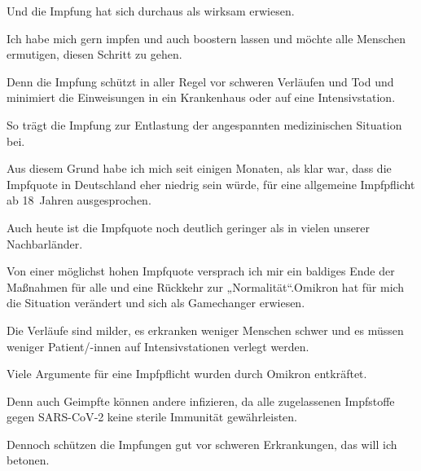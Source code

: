 \documentclass{article}
\begin{document}
\colorbox{CustomColor10}{\parbox{\linewidth}{Und die Impfung hat sich durchaus als wirksam erwiesen.}}

\colorbox{CustomColor11}{\parbox{\linewidth}{Ich habe mich gern impfen und auch boostern lassen und möchte alle Menschen ermutigen, diesen Schritt zu gehen.}}

\colorbox{CustomColor12}{\parbox{\linewidth}{Denn die Impfung schützt in aller Regel vor schweren Verläufen und Tod und minimiert die Einweisungen in ein Krankenhaus oder auf eine Intensivstation.}}

\colorbox{CustomColor13}{\parbox{\linewidth}{So trägt die Impfung zur Entlastung der angespannten medizinischen Situation bei.}}

\colorbox{CustomColor9}{\parbox{\linewidth}{Aus diesem Grund habe ich mich seit einigen Monaten, als klar war, dass die Impfquote in Deutschland eher niedrig sein würde, für eine allgemeine Impfpflicht ab 18 Jahren ausgesprochen.}}

\colorbox{CustomColor14}{\parbox{\linewidth}{Auch heute ist die Impfquote noch deutlich geringer als in vielen unserer Nachbarländer.}}

\colorbox{CustomColor15}{\parbox{\linewidth}{Von einer möglichst hohen Impfquote versprach ich mir ein baldiges Ende der Maßnahmen für alle und eine Rückkehr zur „Normalität“.Omikron hat für mich die Situation verändert und sich als Gamechanger erwiesen.}}

\colorbox{CustomColor15}{\parbox{\linewidth}{Die Verläufe sind milder, es erkranken weniger Menschen schwer und es müssen weniger Patient/-innen auf Intensivstationen verlegt werden.}}

\colorbox{CustomColor16}{\parbox{\linewidth}{Viele Argumente für eine Impfpflicht wurden durch Omikron entkräftet.}}

\colorbox{CustomColor17}{\parbox{\linewidth}{Denn auch Geimpfte können andere infizieren, da alle zugelassenen Impfstoffe gegen SARS-CoV‑2 keine sterile Immunität gewährleisten.}}

\colorbox{CustomColor10}{\parbox{\linewidth}{Dennoch schützen die Impfungen gut vor schweren Erkrankungen, das will ich betonen.}}
\end{document}
